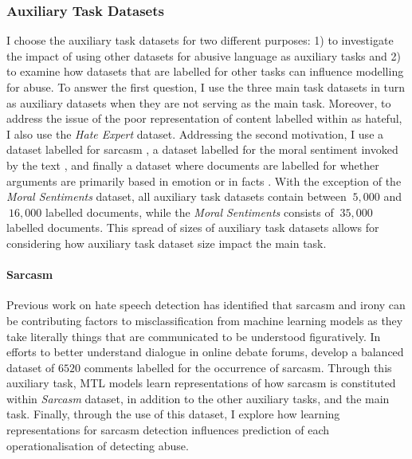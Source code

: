 \subsubsection{Auxiliary Task Datasets}

I choose the auxiliary task datasets for two different purposes: 1) to investigate the impact of using other datasets for abusive language as auxiliary tasks and 2) to examine how datasets that are labelled for other tasks can influence modelling for abuse.
To answer the first question, I use the three main task datasets in turn as auxiliary datasets when they are not serving as the main task. Moreover, to address the issue of the poor representation of content labelled within as hateful, I also use the \textit{Hate Expert} dataset.
Addressing the second motivation, I use a dataset labelled for sarcasm \citep{Oraby_sarcasm:2016}, a dataset labelled for the moral sentiment invoked by the text \citep{Hoover:2019}, and finally a dataset where documents are labelled for whether arguments are primarily based in emotion or in facts \citep{Oraby_factfeel:2015}.
With the exception of the \textit{Moral Sentiments} dataset, all auxiliary task datasets contain between $~5,000$ and $~16,000$ labelled documents, while the \textit{Moral Sentiments} consists of $~35,000$ labelled documents.
This spread of sizes of auxiliary task datasets allows for considering how auxiliary task dataset size impact the main task.

\paragraph{Sarcasm}
Previous work on hate speech detection \citep{Rottger:2021} has identified that sarcasm and irony can be contributing factors to misclassification from machine learning models as they take literally things that are communicated to be understood figuratively.
In efforts to better understand dialogue in online debate forums, \citet{Oraby_sarcasm:2016} develop a balanced dataset of $6520$ comments labelled for the occurrence of sarcasm.
Through this auxiliary task, MTL models learn representations of how sarcasm is constituted within \textit{Sarcasm} dataset, in addition to the other auxiliary tasks, and the main task.
Finally, through the use of this dataset, I explore how learning representations for sarcasm detection influences prediction of each operationalisation of detecting abuse.


